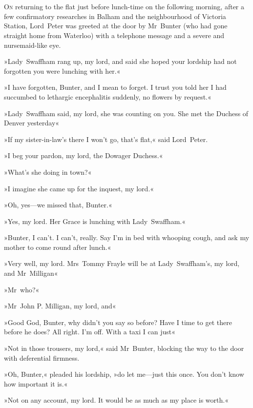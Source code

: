 \chapter[Chapter \thechapter]{}
\lettrine[lines=4]{O}{n} returning to the flat just before lunch-time on the following morning, after a few confirmatory researches in Balham and the neighbourhood of Victoria Station, Lord~Peter was greeted at the door by Mr~Bunter (who had gone straight home from Waterloo) with a telephone message and a severe and nursemaid-like eye.

»Lady~Swaffham rang up, my lord, and said she hoped your lordship had not forgotten you were lunching with her.«

»I have forgotten, Bunter, and I mean to forget. I trust you told her I had succumbed to lethargic encephalitis suddenly, no flowers by request.«

»Lady~Swaffham said, my lord, she was counting on you. She met the Duchess of Denver yesterday\longdash«

»If my sister-in-law's there I won't go, that's flat,« said Lord~Peter.

»I beg your pardon, my lord, the Dowager Duchess.«

»What's she doing in town?«

»I imagine she came up for the inquest, my lord.«

»Oh, yes—we missed that, Bunter.«

»Yes, my lord. Her Grace is lunching with Lady~Swaffham.«

»Bunter, I can't. I can't, really. Say I'm in bed with whooping cough, and ask my mother to come round after lunch.«

»Very well, my lord. Mrs~Tommy Frayle will be at Lady~Swaffham's, my lord, and Mr~Milligan\longdash«

»Mr~who?«

»Mr~John P\@. Milligan, my lord, and\longdash«

»Good God, Bunter, why didn't you say so before? Have I time to get there before he does? All right. I'm off. With a taxi I can just\longdash«

»Not in those trousers, my lord,« said Mr~Bunter, blocking the way to the door with deferential firmness.

»Oh, Bunter,« pleaded his lordship, »do let me—just this once. You don't know how important it is.«

»Not on any account, my lord. It would be as much as my place is worth.«

